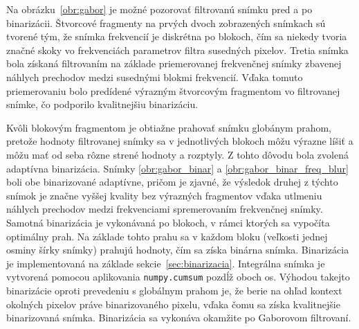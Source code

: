   Na obrázku~{\ref{obr:gabor}}
  je možné pozorovať filtrovanú snímku pred a po binarizácii. Štvorcové fragmenty na prvých dvoch zobrazených snímkach sú tvorené tým, že snímka frekvencií je
  diskrétna po blokoch, čím sa niekedy tvoria značné skoky vo frekvenciách parametrov filtra susedných pixelov. Tretia snímka bola získaná filtrovaním na základe
  priemerovanej frekvenčnej snímky zbavenej náhlych prechodov medzi susednými blokmi frekvencií. Vďaka tomuto priemerovaniu bolo predídené výrazným štvorcovým
  fragmentom vo filtrovanej snímke, čo podporilo kvalitnejšiu binarizáciu.

  Kvôli blokovým fragmentom je obtiažne prahovať snímku globánym prahom, pretože hodnoty filtrovanej snímky sa v jednotlivých blokoch môžu výrazne líšiť a môžu
  mať od seba rôzne strené hodnoty a rozptyly. Z tohto dôvodu bola zvolená adaptívna binarizácia. Snímky \ref{obr:gabor_binar} a
  \ref{obr:gabor_binar_freq_blur} boli obe binarizované adaptívne, pričom je zjavné, že výsledok druhej z týchto snímok je značne vyššej kvality bez výrazných
  fragmentov vďaka utlmeniu náhlych prechodov medzi frekvenciami spremerovaním frekvenčnej snímky. Samotná binarizácia je vykonávaná po blokoch, v rámci ktorých
  sa vypočíta optimálny prah. Na základe tohto prahu sa v každom bloku (veľkosti jednej osminy šírky snímky) prahujú hodnoty,
  čím sa získa binárna snímka. Binarizácia je implementovaná na základe sekcie~{\ref{sec:binarizacia}}. Integrálna snímka je vytvorená pomocou
  aplikovania \texttt{numpy.cumsum} pozdĺž oboch os. Výhodou takejto binarizácie oproti prevedeniu
  s globálnym prahom je, že berie na ohľad kontext okolných pixelov práve binarizovaného pixelu, vďaka čomu sa získa kvalitnejšie binarizovaná snímka.
  Binarizácia sa vykonáva okamžite po Gaborovom filtrovaní.

